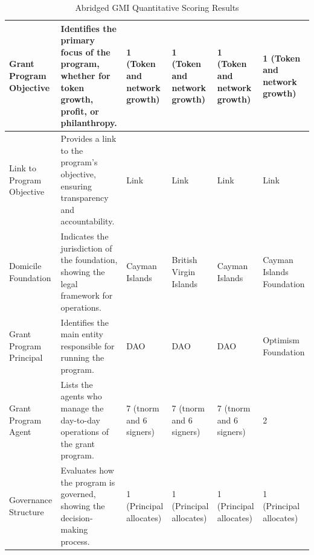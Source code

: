 \documentclass[a4,10pt]{article}
\begin{document}
\begin{table}[ht!]
\begin{tabular}{p{3cm}|p{5cm}|p{2cm}|p{2cm}|p{2cm}|p{2cm}}
Grant Program Objective & Identifies the primary focus of the program, whether for token growth, profit, or philanthropy. & 1 (Token and network growth) & 1 (Token and network growth) & 1 (Token and network growth) & 1 (Token and network growth) \\ \hline
Link to Program Objective & Provides a link to the program’s objective, ensuring transparency and accountability. & Link & Link & Link & Link \\ \hline
Domicile Foundation & Indicates the jurisdiction of the foundation, showing the legal framework for operations. & Cayman Islands & British Virgin Islands & Cayman Islands & Cayman Islands Foundation \\ \hline
Grant Program Principal & Identifies the main entity responsible for running the program. & DAO & DAO & DAO & Optimism Foundation \\ \hline
Grant Program Agent & Lists the agents who manage the day-to-day operations of the grant program. & 7 (tnorm and 6 signers) & 7 (tnorm and 6 signers) & 7 (tnorm and 6 signers) & 2 \\ \hline
Governance Structure & Evaluates how the program is governed, showing the decision-making process. & 1 (Principal allocates) & 1 (Principal allocates) & 1 (Principal allocates) & 1 (Principal allocates) \\ 
\end{tabular}
\caption{Abridged GMI Quantitative Scoring Results}
\label{Table:4}
\end{table}
\end{document}

